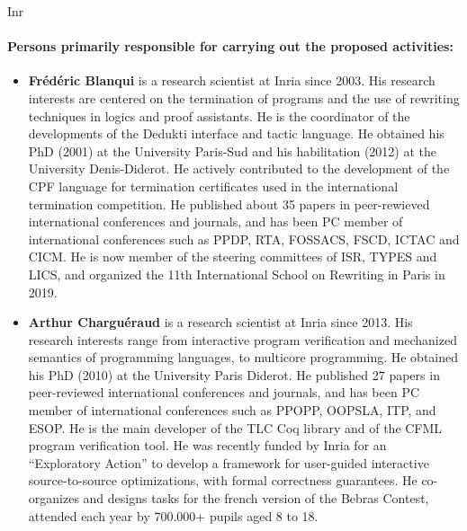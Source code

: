 \begin{sitedescription}{Inr}
\paragraph{Persons primarily responsible for carrying out the proposed activities:}

\begin{itemize} %

\item{\bf Frédéric Blanqui} is a research scientist at Inria since 2003. His research interests are centered on the termination of programs and the use of rewriting techniques in logics and proof assistants. He is the coordinator of the developments of the Dedukti interface and tactic language. He obtained his PhD (2001) at the University Paris-Sud and his habilitation (2012) at the University Denis-Diderot. He actively contributed to the development of the CPF language for termination certificates used in the international termination competition. He published about 35 papers in peer-rewieved international conferences and journals, and has been PC member of international conferences such as PPDP, RTA, FOSSACS, FSCD, ICTAC and CICM. He is now member of the steering committees of ISR, TYPES and LICS, and organized the 11th International School on Rewriting in Paris in 2019.

\item{\bf Arthur Charguéraud} is a research scientist at Inria since 2013.
His research interests range from interactive program verification and mechanized
semantics of programming languages, to multicore programming.
He obtained his PhD (2010) at the University Paris Diderot. He published 27 papers
in peer-reviewed international conferences and journals, and has been PC member
of international conferences such as PPOPP, OOPSLA, ITP, and ESOP. He is the main
developer of the TLC Coq library and of the CFML program verification tool.
He was recently funded by Inria for an ``Exploratory Action'' to develop a framework
for user-guided interactive source-to-source optimizations, with formal correctness
guarantees.
He co-organizes and designs tasks for the french version of the Bebras Contest,
attended each year by 700.000+ pupils aged 8 to 18.



\end{itemize}
\end{sitedescription}
